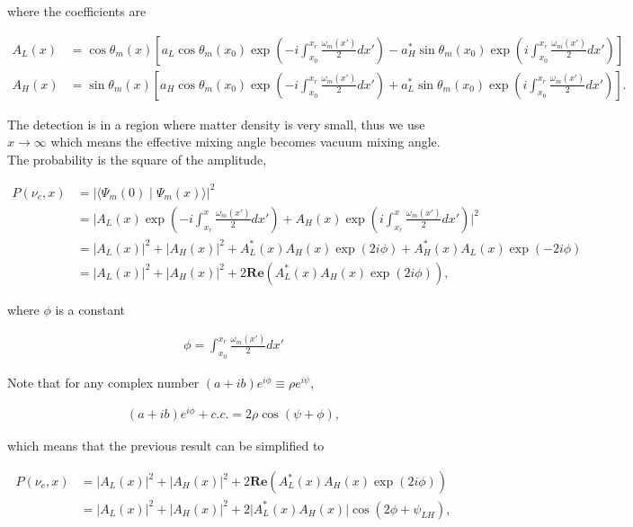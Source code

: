 \documentclass{tufte-handout}
\newcommand{\braket}[2]{\langle #1 \mid #2 \rangle}
\begin{document}
where the coefficients are

\begin{align*}
A_L(x) & = \cos\theta_m(x) \left[ a_L\cos\theta_m(x_0) \exp\left(  -i\int_{x_0}^{x_r} \frac{\omega_m(x')}{2} dx' \right) - a_H^*\sin\theta_m(x_0) \exp\left( i \int_{x_0}^{x_r} \frac{\omega_m(x')}{2}dx' \right)  \right] \\
A_H(x) & = \sin\theta_m(x)  \left[ a_H \cos\theta_m(x_0) \exp\left( -i \int_{x_0}^{x_{r}} \frac{\omega_m(x')}{2} dx'   \right)   + a_L^*\sin\theta_m(x_{0}) \exp\left( i \int_{x_0}^{x_{r}} \frac{\omega_m(x')}{2} dx' \right)    \right]  .
\end{align*}


The detection is in a region where matter density is very small, thus we use $x\to\infty$ which means the effective mixing angle becomes vacuum mixing angle. The probability is the square of the amplitude,

\begin{align*}
P(\nu_e,x) &= \lvert \braket{\Psi_m(0)}{\Psi_m(x)}  \rvert^2 \\
& = \lvert A_L(x) \exp\left( -i \int_{x_r}^{x} \frac{\omega_m(x')}{2} dx'   \right) + A_H(x) \exp\left( i\int_{x_r}^x \frac{\omega_m(x')}{2}dx' \right)  \rvert^2 \\
& = \lvert A_L(x) \rvert^2 + \lvert A_H(x) \rvert^2 + A_L^*(x) A_H(x) \exp(2i\phi) + A_H^*(x) A_L(x) \exp(-2i\phi) \\
& = \lvert A_L(x) \rvert^2 + \lvert A_H(x) \rvert^2 + 2 \mathbf{Re}( A_L^*(x) A_H(x) \exp(2i\phi) ),
\end{align*}

where $\phi$ is a constant

\begin{align*}
\phi = \int_{x_0}^{x_r} \frac{\omega_m(x')}{2}dx' 
\end{align*}

Note that for any complex number $(a+ib)e^{i\phi} \equiv \rho e^{i\psi}$,

\begin{align*}
(a+ib)e^{i\phi} + c.c.=2 \rho \cos(\psi+\phi),
\end{align*}

which means that the previous result can be simplified to 

\begin{align*}
P(\nu_e,x) &=  \lvert A_L(x) \rvert^2 + \lvert A_H(x) \rvert^2 + 2 \mathbf{Re}( A_L^*(x) A_H(x) \exp(2i\phi) ) \\
& =  \lvert A_L(x) \rvert^2 + \lvert A_H(x) \rvert^2 + 2 \lvert A_L^*(x) A_H(x) \rvert \cos\left( 2\phi + \psi_{LH} \right),
\end{align*}
\end{document}
